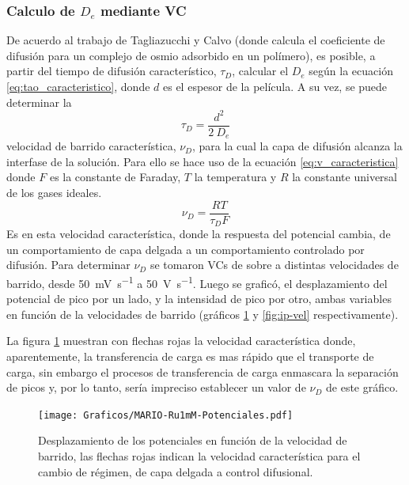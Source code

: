 	 \subsubsection*{Calculo de $D_e$ mediante VC}	
	 
	   	 De acuerdo al trabajo de Tagliazucchi y Calvo\cite{Tagliazucchi2010a} (donde calcula el coeficiente de difusión para un complejo de osmio adsorbido en un polímero), es posible, a partir del tiempo de difusión característico, $\tau_{\scriptscriptstyle{D}}$, calcular el $D_e$ según la ecuación \ref{eq:tao_caracteristico}, donde $d$ es el espesor de la película. A su vez, se puede determinar la \linebreak
	   		\begin{equation}
					\tau_{\scriptscriptstyle{D}}=\frac{d^2}{2\ D_e}
					\label{eq:tao_caracteristico}
			 \end{equation} 
  	  	  velocidad de barrido característica, $\nu_{\scriptscriptstyle{D}}$, para la cual la capa de difusión alcanza la interfase de la solución. Para ello se hace uso de la ecuación \ref{eq:v_caracteristica} donde $F$ es la constante de Faraday, $T$ la temperatura y $R$ la constante universal de los gases ideales.
	  	   	 \begin{equation}
					\nu_{\scriptscriptstyle{D}}=\frac{RT}{\tau_{\scriptscriptstyle{D}}F}
					\label{eq:v_caracteristica}
			 \end{equation}
	     \indent Es en esta velocidad característica, donde la respuesta del potencial cambia, de un comportamiento de capa delgada a un comportamiento controlado por difusión. Para determinar $\nu_{\scriptscriptstyle{D}}$ se tomaron VCs de \ru\space sobre \pdmF\space a distintas velocidades de barrido, desde \SI{50}{\milli\volt\per\second} a \SI{50}{\volt\per\second}. Luego se graficó, el desplazamiento del potencial de pico por un lado, y la intensidad de pico por otro, ambas variables en función de la velocidades de barrido (gráficos \ref{fig:corrimiento-potenciales} y \ref{fig:ip-vel} respectivamente).

	     La figura \ref{fig:corrimiento-potenciales} muestran con flechas rojas la velocidad característica donde, aparentemente, la transferencia de carga es mas rápido que el transporte de carga, sin embargo el procesos de transferencia de carga enmascara la separación de picos y, por lo tanto, sería impreciso establecer un valor de  $\nu_{\scriptscriptstyle{D}}$ de este gráfico.
			
			 \begin{figure}[ht]
					\centering
			 	    \texttt{[image: Graficos/MARIO-Ru1mM-Potenciales.pdf]}
			        \caption[Desplazamiento de potenciales]{Desplazamiento de los potenciales en función de la velocidad de barrido, las flechas rojas indican la velocidad característica para el cambio de régimen, de capa delgada a control difusional.}
			        \label{fig:corrimiento-potenciales}
			      	\end{figure}
         
